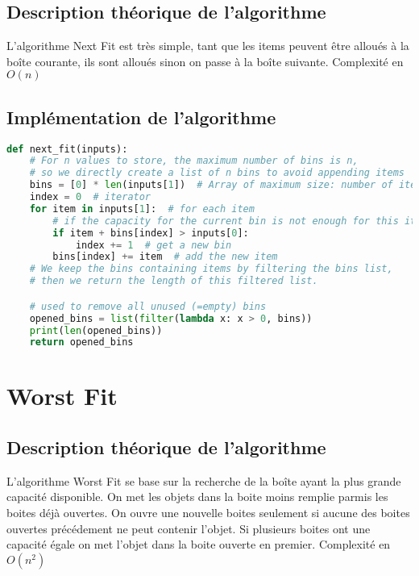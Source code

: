 \documentclass{article}
\begin{document}
\subsection{Description théorique de l'algorithme}
L'algorithme Next Fit est très simple, tant que les items peuvent être alloués à la boîte courante, ils sont alloués sinon on passe à la boîte suivante.
Complexité en $O(n)$

\subsection{Implémentation de l'algorithme}
\begin{lstlisting}[language=Python, frame=single]
def next_fit(inputs):
    # For n values to store, the maximum number of bins is n,
    # so we directly create a list of n bins to avoid appending items
    bins = [0] * len(inputs[1])  # Array of maximum size: number of items
    index = 0  # iterator
    for item in inputs[1]:  # for each item
        # if the capacity for the current bin is not enough for this item
        if item + bins[index] > inputs[0]:
            index += 1  # get a new bin
        bins[index] += item  # add the new item
    # We keep the bins containing items by filtering the bins list,
    # then we return the length of this filtered list.

    # used to remove all unused (=empty) bins
    opened_bins = list(filter(lambda x: x > 0, bins))
    print(len(opened_bins))
    return opened_bins
\end{lstlisting}



\section{Worst Fit}

\subsection{Description théorique de l'algorithme}
L'algorithme Worst Fit se base sur la recherche de la boîte ayant la plus grande capacité disponible.
On met les objets dans la boite moins remplie parmis les boites déjà ouvertes.
On ouvre une nouvelle boites seulement si aucune des boites ouvertes précédement ne peut contenir l'objet.
Si plusieurs boites ont une capacité égale on met l'objet dans la boite ouverte en premier.
Complexité en $O(n^2)$
\end{document}
